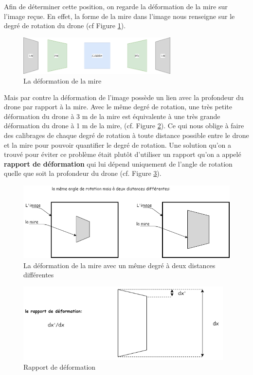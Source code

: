 \documentclass[12pt]{article}
\begin{document}
\begin{enumerate}
            Afin de déterminer cette position, on regarde la déformation de la mire sur l'image reçue. En effet, la forme de la mire dans l’image nous renseigne sur le degré de rotation du drone (cf Figure \ref{fig:image9}).\\
            \begin{figure}[H]
            \centering
            \includegraphics[height=2cm]{image9.png}
            \caption{La déformation de la mire}
            \label{fig:image9}
            \end{figure}
            Mais par contre la déformation de l’image possède un lien avec la profondeur du drone par rapport à la mire. Avec le même degré de rotation, une très petite déformation du drone à 3 m de la mire est équivalente à une très grande déformation du drone à 1 m de la mire, (cf. Figure \ref{fig:image10}). Ce qui nous oblige à faire des calibrages de chaque degré de rotation à toute distance possible entre le drone et la mire pour pouvoir quantifier le degré de rotation.
            Une solution qu’on a trouvé pour éviter ce problème était plutôt d'utiliser un rapport qu’on a appelé \textbf{rapport de déformation} qui lui dépend uniquement de l’angle de rotation quelle que soit la profondeur du drone (cf. Figure \ref{fig:image11}).\\
            \begin{figure}[H]
            \centering
            \includegraphics[height=4cm]{image10.png}
            \caption{La déformation de la mire avec un même degré à deux distances différentes}
            \label{fig:image10}
            \end{figure}
            \begin{figure}[H]
            \centering
            \includegraphics[height=4cm]{image11.png}
            \caption{Rapport de déformation}
            \label{fig:image11}
            \end{figure}
            

\end{enumerate}
\end{document}
